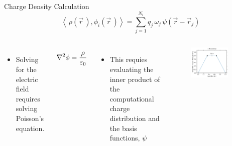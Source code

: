 \documentclass[aspectratio=169, 16pt]{beamer}
\begin{document}
\begin{frame}{Charge Density Calculation}
    \vspace{0.75cm}
    \begin{equation}
      \left< \, 
      \rho(\vec{r}\,), 
      \phi_i(\vec{r}\,)
      \right> 
      = 
      \sum_{j=1}^{N_i} 
      q_j\,
      \omega_j\,
      \psi
      \left( \vec{r} - \vec{r}_j
      \right) 
    \end{equation}
    \vspace{-0.75cm}
  \begin{columns}
    \begin{itemize}
      \item Solving for the electric field requires solving Poisson's equation.
    \end{itemize}
    \begin{align}
      \laplacian \phi = \frac{ \rho }{ \varepsilon_0 }
    \end{align}
    \begin{itemize}
      \item This requies evaluating the inner product of the computational charge distribution and the basis functions, $\psi$
    \end{itemize}
    \begin{figure}[H]
      \centering 
      \includegraphics[width=0.8\textwidth]{figs/charge_1D.png}
    \end{figure}
  \end{columns}
\end{frame}
\end{document}
